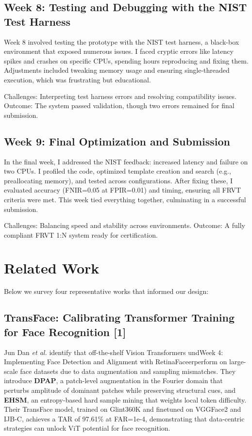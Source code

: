 \documentclass[conference]{IEEEtran}
\begin{document}
\subsection{Week 8: Testing and Debugging with the NIST Test Harness}
Week 8 involved testing the prototype with the NIST test harness, a black-box environment that exposed numerous issues. I faced cryptic errors like latency spikes and crashes on specific CPUs, spending hours reproducing and fixing them. Adjustments included tweaking memory usage and ensuring single-threaded execution, which was frustrating but educational.

Challenges: Interpreting test harness errors and resolving compatibility issues. Outcome: The system passed validation, though two errors remained for final submission.
\subsection{Week 9: Final Optimization and Submission}
In the final week, I addressed the NIST feedback: increased latency and failure on two CPUs. I profiled the code, optimized template creation and search (e.g., preallocating memory), and tested across configurations. After fixing these, I evaluated accuracy (FNIR=0.05 at FPIR=0.01) and timing, ensuring all FRVT criteria were met. This week tied everything together, culminating in a successful submission.

Challenges: Balancing speed and stability across environments. Outcome: A fully compliant FRVT 1:N system ready for certification.


\section{Related Work}
Below we survey four representative works that informed our design:

\subsection{TransFace: Calibrating Transformer Training for Face Recognition [1]}
Jun Dan \emph{et al.} identify that off-the-shelf Vision Transformers und{Week 4: Implementing Face Detection and Alignment with RetinaFace}erperform on large-scale face datasets due to data augmentation and sampling mismatches. They introduce \textbf{DPAP}, a patch-level augmentation in the Fourier domain that perturbs amplitude of dominant patches while preserving structural cues, and \textbf{EHSM}, an entropy-based hard sample mining that weights local token difficulty. Their TransFace model, trained on Glint360K and finetuned on VGGFace2 and IJB-C, achieves a TAR of 97.61\% at FAR=1e-4, demonstrating that data-centric strategies can unlock ViT potential for face recognition.
\end{document}
